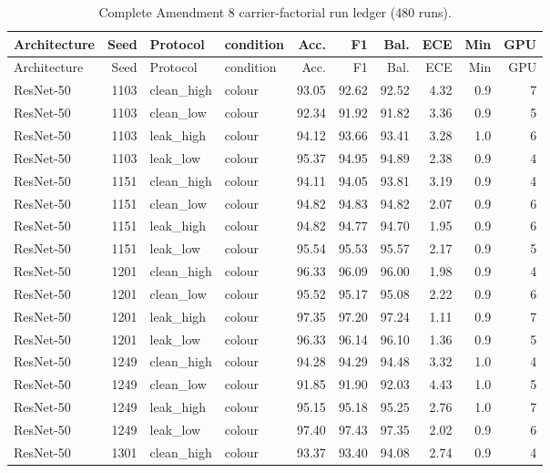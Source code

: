 {\scriptsize
\setlength{\tabcolsep}{3.5pt}
\begin{longtable}{lrllrrrrrr}
\caption{Complete Amendment 8 carrier-factorial run ledger (480 runs).}\label{r:tab:ledger-carrier}\\
\toprule
Architecture & Seed & Protocol & condition & Acc. & F1 & Bal. & ECE & Min & GPU \\
\midrule
\endfirsthead
\toprule
Architecture & Seed & Protocol & condition & Acc. & F1 & Bal. & ECE & Min & GPU \\
\midrule
\endhead
\bottomrule
\endfoot
ResNet-50 & 1103 & clean\_high & colour & 93.05 & 92.62 & 92.52 & 4.32 & 0.9 & 7 \\
ResNet-50 & 1103 & clean\_low & colour & 92.34 & 91.92 & 91.82 & 3.36 & 0.9 & 5 \\
ResNet-50 & 1103 & leak\_high & colour & 94.12 & 93.66 & 93.41 & 3.28 & 1.0 & 6 \\
ResNet-50 & 1103 & leak\_low & colour & 95.37 & 94.95 & 94.89 & 2.38 & 0.9 & 4 \\
ResNet-50 & 1151 & clean\_high & colour & 94.11 & 94.05 & 93.81 & 3.19 & 0.9 & 4 \\
ResNet-50 & 1151 & clean\_low & colour & 94.82 & 94.83 & 94.82 & 2.07 & 0.9 & 6 \\
ResNet-50 & 1151 & leak\_high & colour & 94.82 & 94.77 & 94.70 & 1.95 & 0.9 & 6 \\
ResNet-50 & 1151 & leak\_low & colour & 95.54 & 95.53 & 95.57 & 2.17 & 0.9 & 5 \\
ResNet-50 & 1201 & clean\_high & colour & 96.33 & 96.09 & 96.00 & 1.98 & 0.9 & 4 \\
ResNet-50 & 1201 & clean\_low & colour & 95.52 & 95.17 & 95.08 & 2.22 & 0.9 & 6 \\
ResNet-50 & 1201 & leak\_high & colour & 97.35 & 97.20 & 97.24 & 1.11 & 0.9 & 7 \\
ResNet-50 & 1201 & leak\_low & colour & 96.33 & 96.14 & 96.10 & 1.36 & 0.9 & 5 \\
ResNet-50 & 1249 & clean\_high & colour & 94.28 & 94.29 & 94.48 & 3.32 & 1.0 & 4 \\
ResNet-50 & 1249 & clean\_low & colour & 91.85 & 91.90 & 92.03 & 4.43 & 1.0 & 5 \\
ResNet-50 & 1249 & leak\_high & colour & 95.15 & 95.18 & 95.25 & 2.76 & 1.0 & 7 \\
ResNet-50 & 1249 & leak\_low & colour & 97.40 & 97.43 & 97.35 & 2.02 & 0.9 & 6 \\
ResNet-50 & 1301 & clean\_high & colour & 93.37 & 93.40 & 94.08 & 2.74 & 0.9 & 4 \\

\end{longtable}}
